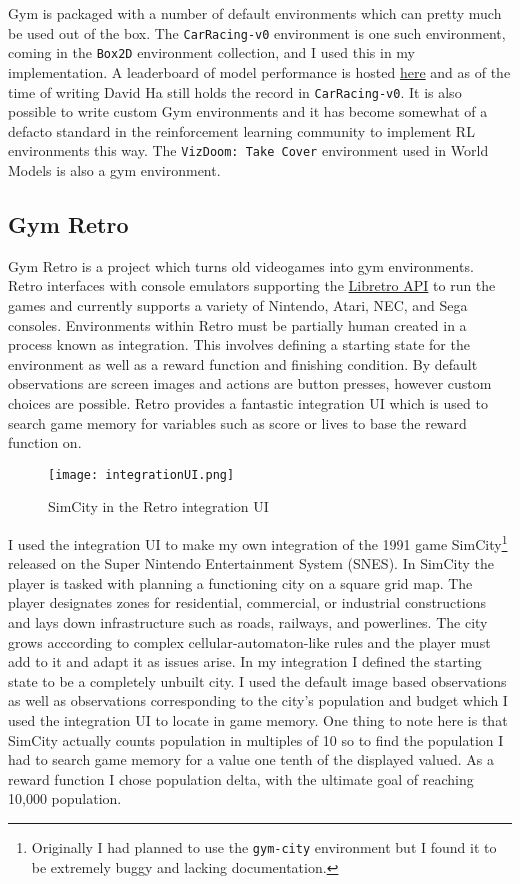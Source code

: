 \documentclass{article}
\numberwithin{figure}{section}
\theoremstyle{definition}
\begin{document}
Gym is packaged with a number of default environments which can pretty much be used out of the box.
The \texttt{CarRacing-v0} environment is one such environment, coming in the \texttt{Box2D} environment collection, and I used this in my implementation.
A leaderboard of model performance is hosted \href{https://github.com/openai/gym/wiki/Leaderboard}{here} and as of the time of writing David Ha still holds the record in \texttt{CarRacing-v0}.
It is also possible to write custom Gym environments and it has become somewhat of a defacto standard in the reinforcement learning community to implement RL environments this way.
The \texttt{VizDoom: Take Cover} environment used in World Models is also a gym environment.

\subsection{Gym Retro}

Gym Retro \citep{nichol2018retro} is a project which turns old videogames into gym environments.
Retro interfaces with console emulators supporting the \href{https://www.libretro.com/index.php/api/}{Libretro API} to run the games and currently supports a variety of Nintendo, Atari, NEC, and Sega consoles.
Environments within Retro must be partially human created in a process known as integration.
This involves defining a starting state for the environment as well as a reward function and finishing condition.
By default observations are screen images and actions are button presses, however custom choices are possible.
Retro provides a fantastic integration UI which is used to search game memory for variables such as score or lives to base the reward function on.

\begin{figure}[h]
  \centering
  \texttt{[image: integrationUI.png]}
  \caption{SimCity in the Retro integration UI}
\end{figure}

I used the integration UI to make my own integration of the 1991 game SimCity\footnote{Originally I had planned to use the \texttt{gym-city} environment but I found it to be extremely buggy and lacking documentation.} released on the Super Nintendo Entertainment System (SNES).
In SimCity the player is tasked with planning a functioning city on a square grid map.
The player designates zones for residential, commercial, or industrial constructions and lays down infrastructure such as roads, railways, and powerlines.
The city grows acccording to complex cellular-automaton-like rules and the player must add to it and adapt it as issues arise.
In my integration I defined the starting state to be a completely unbuilt city.
I used the default image based observations as well as observations corresponding to the city's population and budget which I used the integration UI to locate in game memory.
One thing to note here is that SimCity actually counts population in multiples of 10 so to find the population I had to search game memory for a value one tenth of the displayed valued.
As a reward function I chose population delta, with the ultimate goal of reaching 10,000 population.
\end{document}
